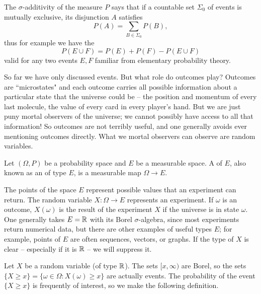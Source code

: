 \begin{subsec}
The $\sigma$-additivity of the measure $P$ says that if a countable set $\Sigma_0$ of events is mutually exclusive, its disjunction $A$ satisfies
$$P(A) = \sum_{B \in \Sigma_0} P(B),$$
thus for example we have the 
$$P(E \cup F) = P(E) + P(F) - P(E \cup F)$$
valid for any two events $E,F$ familiar from elementary probability theory.
\end{subsec}

\begin{subsec}
So far we have only discussed events. But what role do outcomes play?
Outcomes are ``microstates" and each outcome carries all possible information about a particular state that the universe could be -- the position and momentum of every last molecule, the value of every card in every player's hand.
But we are just puny mortal observers of the universe; we cannot possibly have access to all that information!
So outcomes are not terribly useful, and one generally avoids ever mentioning outcomes directly.
What we mortal observers can observe are random variables.
\end{subsec}

\begin{definition}
Let $(\Omega, P)$ be a probability space and $E$ be a measurable space.
A  of  $E$, also known as an  of type $E$, is a measurable map $\Omega \to E$.
\end{definition}

\begin{subsec}
The points of the space $E$ represent possible values that an experiment can return.
The random variable $X: \Omega \to E$ represents an experiment. If $\omega$ is an outcome, $X(\omega)$ is the result of the experiment $X$ if the universe is in state $\omega$.
One generally takes $E = \mathbb{R}$ with its Borel $\sigma$-algebra, since most experiments return numerical data, but there are other examples of useful types $E$; for example, points of $E$ are often sequences, vectors, or graphs.
If the type of $X$ is clear -- especially if it is $\mathbb{R}$ -- we will suppress it.
\end{subsec}

\begin{subsec}
Let $X$ be a random variable (of type $\mathbb{R}$).
The sets $[x, \infty)$ are Borel, so the sets $\{X \geq x\} = \{\omega \in \Omega: X(\omega) \geq x\}$ are actually events.
The probability of the event $\{X \geq x\}$ is frequently of interest, so we make the following definition.
\end{subsec}

